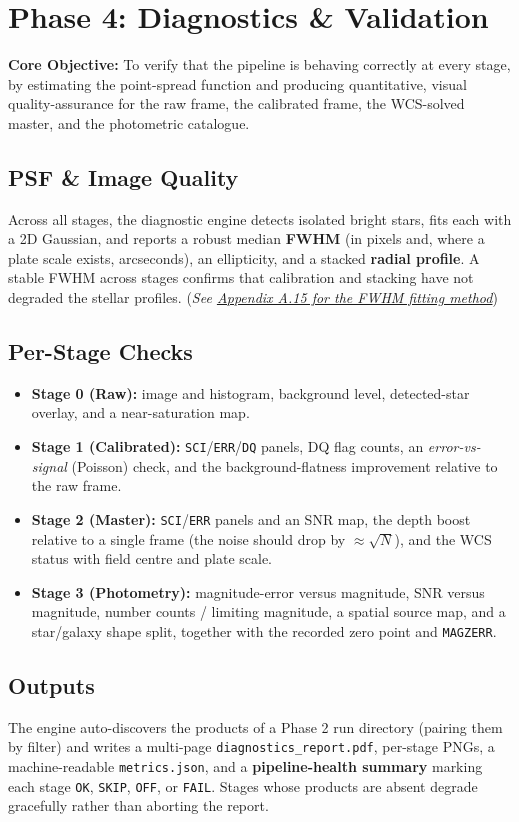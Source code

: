 \documentclass[11pt,a4paper]{article}
\begin{document}
\section{Phase 4: Diagnostics \& Validation}
\textbf{Core Objective:} To verify that the pipeline is behaving correctly at every stage, by estimating the point-spread function and producing quantitative, visual quality-assurance for the raw frame, the calibrated frame, the WCS-solved master, and the photometric catalogue.

\subsection{PSF \& Image Quality}
Across all stages, the diagnostic engine detects isolated bright stars, fits each with a 2D Gaussian, and reports a robust median \textbf{FWHM} (in pixels and, where a plate scale exists, arcseconds), an ellipticity, and a stacked \textbf{radial profile}. A stable FWHM across stages confirms that calibration and stacking have not degraded the stellar profiles. (\textit{See \hyperref[app:psf]{Appendix A.15 for the FWHM fitting method}})

\subsection{Per-Stage Checks}
\begin{itemize}[leftmargin=*]
    \item \textbf{Stage 0 (Raw):} image and histogram, background level, detected-star overlay, and a near-saturation map.
    \item \textbf{Stage 1 (Calibrated):} \texttt{SCI}/\texttt{ERR}/\texttt{DQ} panels, DQ flag counts, an \emph{error-vs-signal} (Poisson) check, and the background-flatness improvement relative to the raw frame.
    \item \textbf{Stage 2 (Master):} \texttt{SCI}/\texttt{ERR} panels and an SNR map, the depth boost relative to a single frame (the noise should drop by $\approx\!\sqrt{N}$), and the WCS status with field centre and plate scale.
    \item \textbf{Stage 3 (Photometry):} magnitude-error versus magnitude, SNR versus magnitude, number counts / limiting magnitude, a spatial source map, and a star/galaxy shape split, together with the recorded zero point and \texttt{MAGZERR}.
\end{itemize}

\subsection{Outputs}
The engine auto-discovers the products of a Phase 2 run directory (pairing them by filter) and writes a multi-page \texttt{diagnostics\_report.pdf}, per-stage PNGs, a machine-readable \texttt{metrics.json}, and a \textbf{pipeline-health summary} marking each stage \texttt{OK}, \texttt{SKIP}, \texttt{OFF}, or \texttt{FAIL}. Stages whose products are absent degrade gracefully rather than aborting the report.
\end{document}
